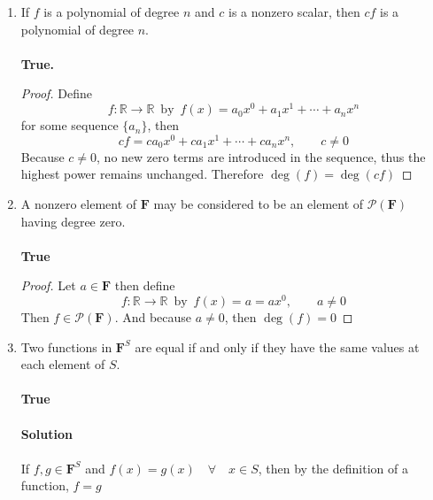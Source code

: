 \documentclass[12pt]{article}
\newcommand{\pf}{\mathcal{P}(\mathbf{F})}
\newcommand{\R}{\mathbb{R}}
\newcommand{\Fb}{\mathbf{F}}
\begin{document}
\begin{enumerate}
\begin{enumerate}
            \textbf{False.} by counterexample.
            \begin{proof}
                    Let $$f(x) = x^2 + 1\qquad \text{and} \qquad g(x) = -x^2$$
                    Then $(f+g)(x) = 1$, and 
                    $$\deg{f} = 2 \qquad \deg{g} = 2 \qquad \deg{(f+g)}=0$$
                    But $0 \not = 2$, therefore it is false by counterexample.
            \end{proof}\vspace{0.4in}
        \item If $f$ is a polynomial of degree $n$ and $c$ is a nonzero scalar, then $cf$ is a polynomial of degree $n$.
        \\\\\textbf{True.}
        \begin{proof}
            Define $$f : \R \to \R\, \text{ by }\, f(x) = a_0x^0 + a_1x^1 + \cdots + a_nx^n$$ for some sequence $\{a_n\}$, then\\
            $$cf = ca_0x^0 + ca_1x^1 + \cdots + ca_nx^n ,\qquad c \not = 0$$
            Because $c \not = 0$, no new zero terms are introduced in the sequence, thus the highest power remains unchanged. Therefore $\deg{(f)} = \deg{(cf)}$
        \end{proof}\vspace{0.4in}
        \item A nonzero element of $\mathbf{F}$ may be considered to be an element of $\mathcal{P}(\mathbf{F})$ having degree zero.\\\\
        \textbf{True}
        \begin{proof}
            Let $a \in \Fb$ then define $$f: \R\to\R\, \text{ by } \,f(x) = a = ax^0, \qquad a \not = 0$$Then $f \in \pf$. And because $a \not = 0$, then $\deg{(f)} = 0$
        \end{proof}\vspace{0.4in}
        \item Two functions in $\mathbf{F}^S$ are equal if and only if they have the same values at each element of $S$.\\\\
        \textbf{True}
        \\\\\textbf{Solution}\\\\
        If $f, g \in \mathbf{F}^S$ and $f(x) = g(x) \quad \forall \quad x \in S$, then by the definition of a function, $f = g$

\end{enumerate}
\end{enumerate}
\end{document}
